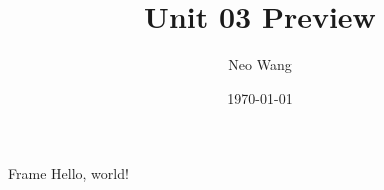 \documentclass{beamer}
\title{Unit 03 Preview}
\date{\today}
\author{Neo Wang}
\institute{Westlake High School}
\begin{document}
  \maketitle
  \tableofcontents
  \begin{frame}{Frame}
    Hello, world!
  \end{frame}
\end{document}
